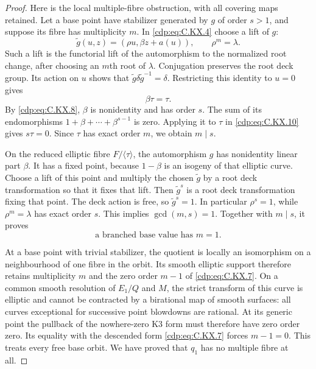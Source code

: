 \begin{proof}
Here is the local
multiple-fibre
obstruction, with
all covering maps
retained. Let a
base point have
stabilizer generated
by $g$ of order
$s>1$, and suppose
its fibre has
multiplicity $m$.
In \eqref{cdp:eq:C.KX.4} choose
a lift of $g$:
\[
 \widetilde g(u,z)
       =(\rho u,\beta z+a(u)),\qquad
       \rho^m=\lambda .
                                                               \tag{C.KX.9}\label{cdp:eq:C.KX.9}
\]
Such a lift is the
functorial lift of
the automorphism
to the normalized
root change, after
choosing an $m$th
root of $\lambda$.
Conjugation preserves
the root deck group.
Its action on $u$
shows that
$\widetilde g\delta
 \widetilde g^{-1}=\delta$.
Restricting this
identity to $u=0$
gives
\[
                         \beta\tau=\tau .
                                                               \tag{C.KX.10}\label{cdp:eq:C.KX.10}
\]
By \eqref{cdp:eq:C.KX.8}, $\beta$
is nonidentity and
has order $s$.
The sum of its
endomorphisms
$1+\beta+\cdots+\beta^{s-1}$
is zero. Applying
it to $\tau$ in
\eqref{cdp:eq:C.KX.10} gives
$s\tau=0$.
Since $\tau$ has
exact order $m$,
we obtain $m\mid s$.

On the reduced
elliptic fibre
$F/\langle\tau\rangle$,
the automorphism
$g$ has nonidentity
linear part $\beta$.
It has a fixed
point, because
$1-\beta$ is an
isogeny of that
elliptic curve.
Choose a lift of
this point and
multiply the
chosen $\widetilde g$
by a root deck
transformation so
that it fixes
that lift.
Then $\widetilde g^s$
is a root deck
transformation
fixing that point.
The deck action
is free, so
$\widetilde g^s=1$.
In particular
$\rho^s=1$, while
$\rho^m=\lambda$
has exact order
$s$. This implies
$\gcd(m,s)=1$.
Together with
$m\mid s$, it
proves
\[
          \text{a branched base value has }m=1 .
                                                               \tag{C.KX.11}\label{cdp:eq:C.KX.11}
\]

At a base point
with trivial
stabilizer, the
quotient is locally
an isomorphism
on a neighbourhood
of one fibre in
the orbit. Its
smooth elliptic
support therefore
retains multiplicity
$m$ and the zero
order $m-1$ of
\eqref{cdp:eq:C.KX.7}.
On a common smooth
resolution of
$E_1/Q$ and $M$,
the strict transform
of this curve is
elliptic and cannot
be contracted by
a birational map
of smooth surfaces:
all curves
exceptional for
successive point
blowdowns are
rational.
At its generic
point the pullback
of the nowhere-zero
K3 form must
therefore have
zero order zero.
Its equality with
the descended form
\eqref{cdp:eq:C.KX.7} forces
$m-1=0$.
This treats every
free base orbit.
We have proved
that $q_1$ has
no multiple fibre
at all.


\end{proof}
